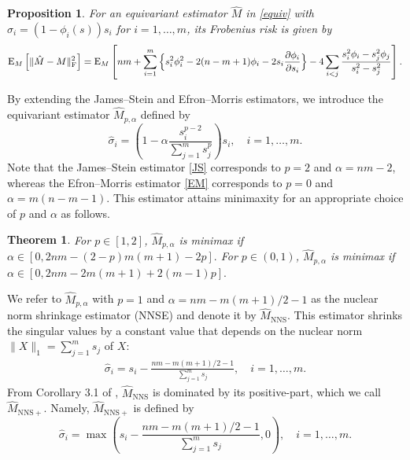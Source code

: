\documentclass[11pt, a4paper]{article}
\newtheorem{theorem}{Theorem}
\newtheorem{proposition}{Proposition}
\theoremstyle{remark}
\begin{document}
\begin{proposition} \citep{stein1974estimation,matsuda2019improved}\label{unbias}
    For an equivariant estimator $\hat M$ in \eqref{equiv} with $\hat{\sigma}_i=(1-\phi_i(s)) s_i$ for $i=1,\dots,m$,  its Frobenius risk is given by 
\begin{equation*}
    {\rm E}_M \left[ \| \hat{M}-M \|_{\mathrm{F}}^2 \right] = {\rm E}_M \left[ nm+\sum_{i=1}^m\Big\{s_i^2\phi_i^2-2(n-m+1)\phi_i-2s_i\frac{\partial\phi_i}{\partial s_i} \Big\}-4\sum_{i<j}\frac{s_i^2\phi_i-s_j^2\phi_j}{s_i^2-s_j^2} \right].
\end{equation*}
\end{proposition}

By extending the James--Stein and Efron--Morris estimators, we introduce the equivariant estimator $\hat{M}_{p,\alpha}$ defined by
\[
\hat{\sigma}_i=\left( 1-\alpha\frac{s_i^{p-2}}{\sum_{j=1}^ms_j^p} \right) s_i, \quad i=1,\dots,m.
\]
Note that the James--Stein estimator \eqref{JS} corresponds to $p=2$ and $\alpha=nm-2$, whereas the Efron--Morris estimator \eqref{EM} corresponds to $p=0$ and $\alpha=m(n-m-1)$. 
This estimator attains minimaxity for an appropriate choice of $p$ and $\alpha$ as follows.

\begin{theorem} \label{norm-minimax}
   For $p\in[1,2]$, $\hat M_{p,\alpha}$ is minimax if $\alpha\in[0, 2nm-(2-p)m(m+1)-2p].$ 
   For $p\in(0,1)$, $\hat M_{p,\alpha}$ is minimax if $\alpha\in[0, 2nm-2m(m+1)+2(m-1)p].$
\end{theorem}


We refer to $\hat{M}_{p,\alpha}$ with $p=1$ and $\alpha=nm-m(m+1)/2-1$ as the nuclear norm shrinkage estimator (NNSE) and denote it by $\hat{M}_{\mathrm{NNS}}$.
This estimator shrinks the singular values by a constant value that depends on the nuclear norm $\| X \|_1 = \sum_{j=1}^m s_j$ of $X$:
\begin{align}
\hat{\sigma}_i =  s_i-\frac{nm-m(m+1)/2-1}{\sum_{j=1}^m s_j}, \quad i=1,\dots,m. \label{NNSest}
\end{align} 
From Corollary 3.1 of \cite{tsukuma2008admissibility}, $\hat{M}_{\mathrm{NNS}}$ is dominated by its positive-part, which we call $\hat{M}_{\mathrm{NNS+}}$. 
Namely, $\hat{M}_{\mathrm{NNS+}}$ is defined by
\[
\hat{\sigma}_i=\max\left( s_i-\frac{nm-m(m+1)/2-1}{\sum_{j=1}^m s_j}, 0 \right), \quad i=1,\dots,m.
\]
\end{document}
